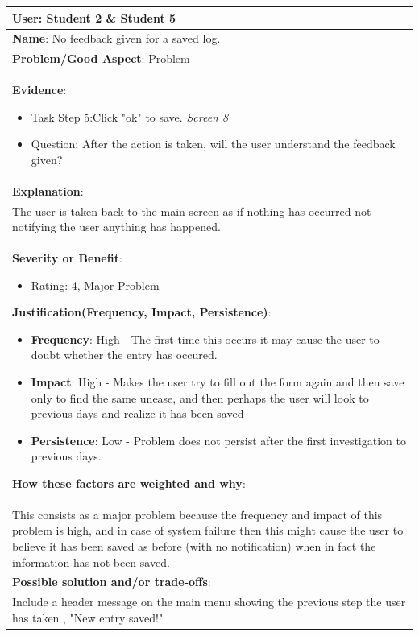 \documentclass[pdftex,12pt,a4paper]{report}
\begin{document}
\begin{center}
	\begin{longtable}{|p{\textwidth}|}
	\hline
	\textbf{User}: Student 2 \& Student 5\\
	\hline
	\textbf{Name}: No feedback given for a saved log.\\
	\hline
	\textbf{Problem/Good Aspect}: Problem\\
	\hline
	\textbf{Evidence}:
	\begin{itemize}
	\item{Task Step 5:Click "ok" to save. \textit{Screen 8}}
	\item{Question: After the action is taken, will the user understand the feedback given?}
	\end{itemize}\\
	\hline
	\textbf{Explanation}:\\
	The user is taken back to the main screen as if nothing has occurred not notifying the user anything has happened.\\
	\hline
	\textbf{Severity or Benefit}:
	\begin{itemize}
	\item{Rating: 4, Major Problem}
	\end{itemize}
	\textbf{Justification(Frequency, Impact, Persistence)}:
	\begin{itemize}
	\item{\textbf{Frequency}:} High - The first time this occurs it may cause the user to doubt whether the entry has occured.
	\item{\textbf{Impact}:} High - Makes the user try to fill out the form again and then save only to find the same unease, and then perhaps the user will look to previous days and realize it has been saved
	\item{\textbf{Persistence}:} Low - Problem does not persist after the first investigation to previous days.
	\end{itemize}
	\textbf{How these factors are weighted and why}:\\
	This consists as a major problem because the frequency and impact of this problem is high, and in case of system failure then this might cause the user to believe it has been saved as before (with no notification) when in fact the information has not been saved.\\
	\hline
	\textbf{Possible solution and/or trade-offs}:\\
	Include a header message on the main menu showing the previous step the user has taken , "New entry saved!"\\
	\hline
	\end{longtable}
\end{center}
\end{document}
